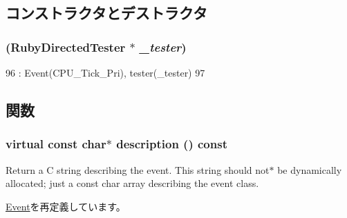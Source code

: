 \subsection{コンストラクタとデストラクタ}
\hypertarget{classRubyDirectedTester_1_1DirectedStartEvent_af78c64e46cf00d0b6639e08d8db18183}{
\subsubsection[{DirectedStartEvent}]{ ({\bf RubyDirectedTester} $\ast$ {\em \_\-tester})}}
\label{classRubyDirectedTester_1_1DirectedStartEvent_af78c64e46cf00d0b6639e08d8db18183}



\begin{DoxyCode}
96             : Event(CPU_Tick_Pri), tester(_tester)
97         {}
\end{DoxyCode}


\subsection{関数}
\hypertarget{classRubyDirectedTester_1_1DirectedStartEvent_a130ddddf003422b413e2e891b1b80e8f}{
\subsubsection[{description}]{\setlength{\rightskip}{0pt plus 5cm}virtual const char$\ast$ description () const}}
\label{classRubyDirectedTester_1_1DirectedStartEvent_a130ddddf003422b413e2e891b1b80e8f}
Return a C string describing the event. This string should not$\ast$ be dynamically allocated; just a const char array describing the event class. 

\hyperlink{classEvent_a130ddddf003422b413e2e891b1b80e8f}{Event}を再定義しています。


